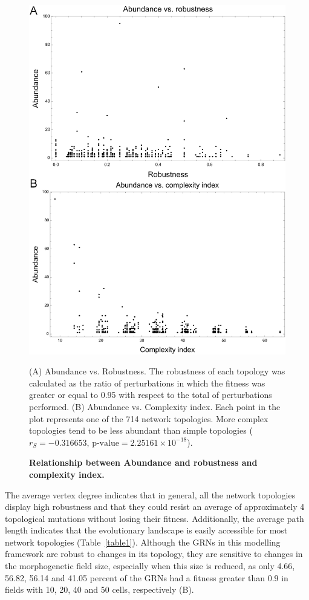 \documentclass[10pt,letterpaper]{article}
\begin{document}
\begin{figure}[!h]
 \includegraphics[width=\textwidth]{figures/results/Fig6}
 \caption{\bf Relationship between Abundance and robustness and complexity
 index.} (A) Abundance vs. Robustness. The robustness of each topology was
 calculated as the ratio of perturbations in which the fitness was greater or
 equal to 0.95 with respect to the total of perturbations performed.
 (B) Abundance vs. Complexity index. Each point in the plot represents one of
 the 714 network topologies. More complex topologies tend to be less abundant
 than simple topologies
 ($r_S = -0.316653$, $\text{p-value} = 2.25161\times10^{-18}$).
 \label{fig:ab-rob}
\end{figure}

The average vertex degree indicates that in general, all the network topologies
display high robustness and that they could resist an average of approximately 4
topological mutations without losing their fitness. Additionally, the average
path length indicates that the evolutionary landscape is easily accessible for
most network topologies (Table~\ref{table1}). Although the GRNs in this modelling
framework are robust to changes in its topology, they are sensitive to changes in
the morphogenetic field size, especially when this size is reduced, as only
4.66, 56.82, 56.14 and 41.05 percent of the GRNs had a fitness greater than 0.9
in fields with 10, 20, 40 and 50 cells, respectively (B).
\end{document}

